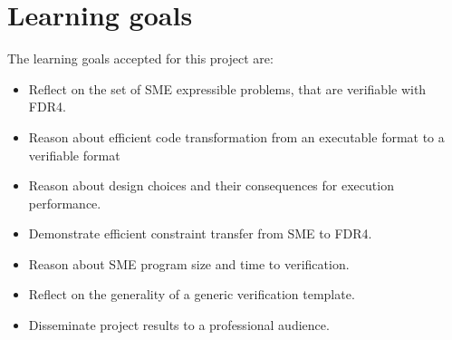 \section{Learning goals}
The learning goals accepted for this project are:
\begin{itemize}
\item Reflect on the set of SME expressible problems, that are verifiable with FDR4.
\item Reason about efficient code transformation from an executable format to a verifiable format
\item Reason about design choices and their consequences for execution performance.
\item Demonstrate efficient constraint transfer from SME to FDR4.
\item Reason about SME program size and time to verification.
\item Reflect on the generality of a generic verification template.
\item Disseminate project results to a professional audience.
\end{itemize}

